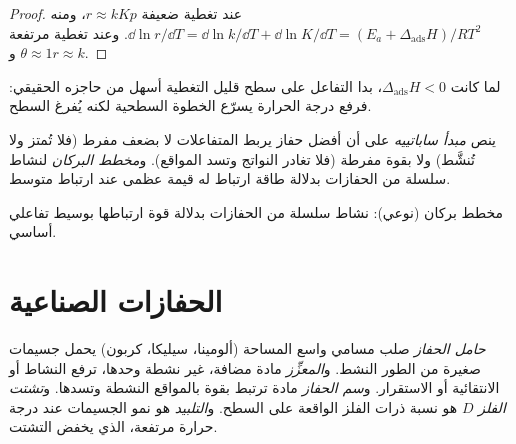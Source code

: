 \begin{proof}
عند تغطية ضعيفة $r \approx kKp$، ومنه $\dd\ln r/\dd T = \dd\ln k/\dd T + \dd\ln K/\dd T = (E_a + \Delta_{\mathrm{ads}}H)/RT^2$.
وعند تغطية مرتفعة $\theta \approx 1$ و$r \approx k$.
\end{proof}

لما كانت $\Delta_{\mathrm{ads}}H < 0$، بدا التفاعل على سطح قليل التغطية أسهل من
حاجزه الحقيقي: فرفع درجة الحرارة يسرّع الخطوة السطحية لكنه يُفرغ
السطح.

\begin{definition}\label{def:b3:surfaces-catalysis:sabatier}
ينص \emph{مبدأ ساباتييه} على أن أفضل
حفاز يربط المتفاعلات لا بضعف مفرط (فلا تُمتز ولا
تُنشَّط) ولا بقوة مفرطة (فلا تغادر النواتج وتسد المواقع). 
و\emph{مخطط البركان} لنشاط سلسلة من
الحفازات بدلالة طاقة ارتباط له قيمة عظمى عند ارتباط متوسط.
\end{definition}

\begin{omfigure}

{\small مخطط بركان (نوعي): نشاط سلسلة من الحفازات
بدلالة قوة ارتباطها بوسيط تفاعلي أساسي.}
\end{omfigure}

\section{الحفازات الصناعية}

\begin{definition}\label{def:b3:surfaces-catalysis:catalyst-design}
\emph{حامل الحفاز} صلب مسامي واسع المساحة
(ألومينا، سيليكا، كربون) يحمل جسيمات صغيرة من الطور النشط. 
و\emph{المعزِّز} مادة مضافة، غير نشطة وحدها، ترفع
النشاط أو الانتقائية أو الاستقرار. و\emph{سم الحفاز}
مادة ترتبط بقوة بالمواقع النشطة وتسدها.
و\emph{تشتت الفلز} $D$ هو نسبة ذرات
الفلز الواقعة على السطح. و\emph{التلبيد} هو نمو
الجسيمات عند درجة حرارة مرتفعة، الذي يخفض التشتت.
\end{definition}

